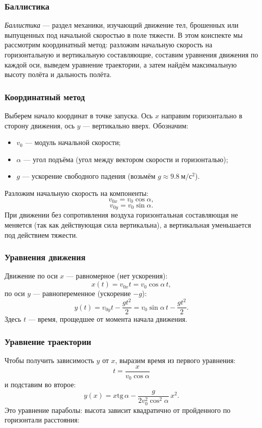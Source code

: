 \documentclass[12pt, a4paper]{article}%
\begin{document}
\subsubsection*{Баллистика}
\textit{Баллистика} — раздел механики, изучающий движение тел, брошенных или выпущенных под начальной скоростью в поле тяжести.
В этом конспекте мы рассмотрим координатный метод: разложим начальную скорость на горизонтальную и вертикальную составляющие,
составим уравнения движения по каждой оси, выведем уравнение траектории, а затем найдём максимальную высоту полёта и дальность
полёта.

\subsubsection*{Координатный метод}
Выберем начало координат в точке запуска. Ось $x$ направим горизонтально в сторону движения, ось $y$ — вертикально вверх. Обозначим:
\begin{itemize}
  \item $v_0$ — модуль начальной скорости;
  \item $\alpha$ — угол подъёма (угол между вектором скорости и горизонталью);
  \item $g$ — ускорение свободного падения (возьмём $g\approx9.8\ \mathrm{м/с^2}$).
\end{itemize}
Разложим начальную скорость на компоненты:
\[
v_{0x} = v_0\cos\alpha,
\]
\[
v_{0y} = v_0\sin\alpha.
\]
При движении без сопротивления воздуха горизонтальная составляющая не меняется (так как действующая сила вертикальна), а вертикальная уменьшается под действием тяжести.

\subsubsection*{Уравнения движения}
Движение по оси $x$ — равномерное (нет ускорения):
\[
x(t) = v_{0x}t = v_0\cos\alpha\,t,
\]
по оси $y$ — равнопеременное (ускорение $-g$):
\[
y(t) = v_{0y}t - \frac{gt^2}{2} = v_0\sin\alpha\,t - \frac{gt^2}{2}.
\]
Здесь $t$ — время, прощедшее от момента начала движения.

\subsubsection*{Уравнение траектории}
Чтобы получить зависимость $y$ от $x$, выразим время из первого уравнения:
\[
t = \frac{x}{v_0\cos\alpha}
\]
и подставим во второе:
\[
y(x) = x\text{tg}\,\alpha - \frac{g}{2v_0^2\cos^2\alpha}\,x^2.
\]
Это уравнение параболы: высота зависит квадратично от пройденного по горизонтали расстояния:
\end{document}
